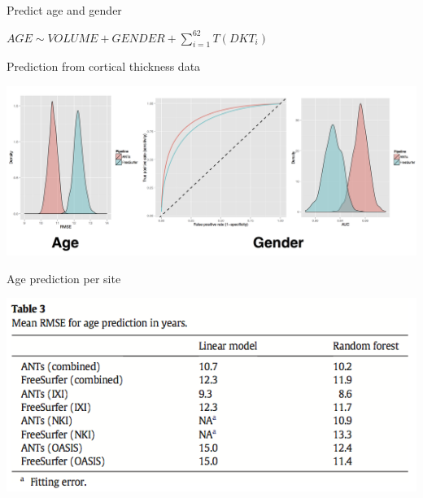 \documentclass[ignorenonframetext,]{beamer}
\begin{document}
\begin{frame}{Predict age and gender}

\(AGE \sim VOLUME + GENDER + \sum_{i=1}^{62} T(DKT_i)\)

\end{frame}

\begin{frame}{Prediction from cortical thickness data}

\includegraphics{./evaluation/figures/evaluation.png}

\end{frame}

\begin{frame}{Age prediction per site}

\includegraphics{./evaluation/figures/agePredictionPerSite.png}

\end{frame}
\end{document}
